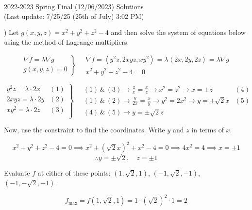 \documentclass{article}
\begin{document}
\newpage

\begin{center}
2022-2023 Spring Final (12/06/2023) Solutions\\
(Last update: 7/25/25 (25th of July) 3:02 PM)
\end{center}

) Let $g(x,y,z)=x^2+y^2+z^2-4$ and then solve the system of equations below using the method of Lagrange multipliers.

\[
\left.
\begin{array}{ll}
\displaystyle\nabla f =\lambda \nabla g \\
\displaystyle g(x,y,z) = 0
\end{array}
\right\}\quad
\begin{array}{ll}
\nabla f = \left\langle y^2z,2xyz,xy^2\right\rangle = \lambda\left\langle2x,2y,2z\right\rangle = \lambda\nabla g \\[0.2cm] x^2+y^2+z^2-4=0
\end{array}
\]

\[
\left.
\begin{array}{ll}
\displaystyle y^2z =\lambda \cdot2x & (1)\\[0.2cm]
\displaystyle 2xyz =\lambda \cdot2y & (2)\\[0.2cm]
\displaystyle xy^2 =\lambda \cdot2z & (3)\\[0.2cm]
\end{array}
\right\}\quad
\begin{array}{ll}
\displaystyle(1)\,\&\,(3)\rightarrow\frac{z}{x}=\frac{x}{z}\rightarrow x^2=z^2\rightarrow x=\pm z&(4)\\[0.4cm]
\displaystyle(1)\,\&\,(2)\rightarrow\frac{y}{2x}=\frac{x}{y}\rightarrow y^2=2x^2\rightarrow y=\pm\sqrt{2}x&(5)\\[0.4cm]\displaystyle(4)\,\&\,(5)\rightarrow y=\pm \sqrt 2z
\end{array}
\]

\hfill

\noindent Now, use the constraint to find the coordinates. Write $y$ and $z$ in terms of $x$.

\[x^2+y^2+z^2-4=0\implies x^2+\left(\sqrt2x\right)^2+x^2-4=0\implies4x^2=4\implies x=\pm1\]
\[\therefore y=\pm\sqrt2,\quad z=\pm1\]

\hfill

\noindent Evaluate $f$ at either of these points: $(1,\sqrt2,1)$, $(-1,\sqrt2,-1)$, $(-1,-\sqrt2,-1)$.

\[f_{\text{max}}=f(1,\sqrt2,1)=1\cdot\left(\sqrt2\right)^2\cdot1=\boxed{2}\]
\end{document}
